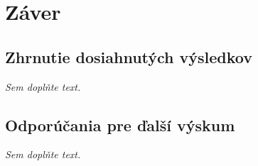 \chapter{Záver}

\section{Zhrnutie dosiahnutých výsledkov}
\indent \textit{Sem doplňte text.}

\section{Odporúčania pre ďalší výskum}
\indent \textit{Sem doplňte text.}
